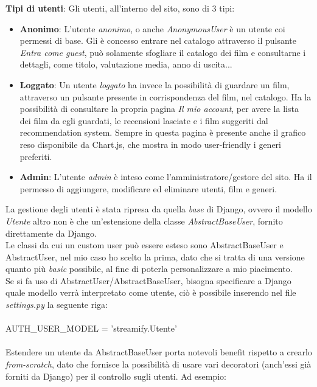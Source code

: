 \documentclass[12pt]{article}
\begin{document}
	\noindent \textbf{Tipi di utenti}: Gli utenti, all'interno del sito, sono di 3 tipi:
	\begin{itemize}
		\item \textbf{Anonimo}: L'utente \textit{anonimo}, o anche \textit{AnonymousUser} è un utente coi permessi di base. Gli è concesso entrare nel catalogo attraverso il pulsante \textit{Entra come guest}, può solamente sfogliare il catalogo dei film e consultarne i dettagli, come titolo, valutazione media, anno di uscita...
		 
		\item \textbf{Loggato}: Un utente \textit{loggato} ha invece la possibilità di guardare un film, attraverso un pulsante presente in corrispondenza del film, nel catalogo. Ha la possibilità di consultare la propria pagina \textit{Il mio account}, per avere la lista dei film da egli guardati, le recensioni lasciate e i film suggeriti dal recommendation system. Sempre in questa pagina è presente anche il grafico reso disponibile da Chart.js, che mostra in modo user-friendly i generi preferiti.
		\item \textbf{Admin}: L'utente \textit{admin} è inteso come l'amministratore/gestore del sito. Ha il permesso di aggiungere, modificare ed eliminare utenti, film e generi. \\
	\end{itemize}

	\noindent La gestione degli utenti è stata ripresa da quella \textit{base} di Django, ovvero il modello \textit{Utente} altro non è che un'estensione della classe \textit{AbstractBaseUser}, fornito direttamente da Django. \\
	Le classi da cui un custom user può essere esteso sono AbstractBaseUser e AbstractUser, nel mio caso ho scelto la prima, dato che si tratta di una versione quanto più \textit{basic} possibile, al fine di poterla personalizzare a mio piacimento. \\
	Se si fa uso di AbstractUser/AbstractBaseUser, bisogna specificare a Django quale modello verrà interpretato come utente, ciò è possibile inserendo nel file \textit{settings.py} la seguente riga: \\ \\
	AUTH\_USER\_MODEL = 'streamify.Utente' \\ \\
	Estendere un utente da AbstractBaseUser porta notevoli benefit rispetto a crearlo \textit{from-scratch}, dato che fornisce la possibilità di usare vari decoratori (anch'essi già forniti da Django) per il controllo sugli utenti. Ad esempio: 
	
\end{document}
